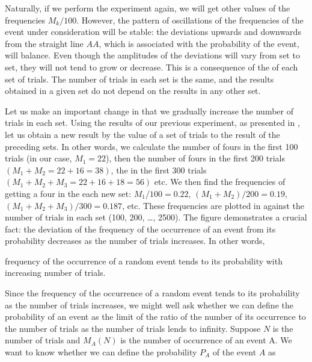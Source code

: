 Naturally, if we perform the experiment again,
we will get other values of the frequencies $M_{k}/100$. However, the
pattern of oscillations of the frequencies of the event under
consideration will be stable: the deviations upwards and downwards
from the straight line $AA$, which is associated with the probability
of the event, will balance. Even though the amplitudes of the
deviations will vary from set to set, they will not tend to grow or
decrease. This is a consequence of the  of each set
of trials. The number of trials in each set is the same, and the
results obtained in a given set do not depend on the results in any
other set.


 

Let us make an important change in that we gradually increase the
number of trials in each set. Using the results of our previous
experiment, as presented in , let us obtain a new
result by  the value of a set of trials to the result of
the preceding sets. In other words, we calculate the number of fours
in the first 100 trials (in our case, $M_{1} = 22$), then the number of
fours in the first 200 trials $(M_{1} + M_{2} = 22 + 16 = 38)$, the in
the first 300 trials  $(M_{1} + M_{2} +  M_{3}  = 22 + 16 + 18 = 56)$
etc. We then find the frequencies of getting a four in the each new
set: $M_{1}/100 = 0.22$, $(M_{1} + M_{2} )/200 = 0.19$, $(M_{1} +
M_{2} +  M_{3})/300  = 0.187$, etc.  These frequencies are plotted in
 against the number of trials in each set (100,
200, \ldots, 2500). The figure demonstrates a crucial fact: the
deviation of the frequency of the occurrence of an event from its
probability decreases as the number of trials increases. In other
words, 
\begin{mybox}{}
frequency of the occurrence of a random event tends to its probability with increasing number of trials.
\end{mybox}




Since the frequency of the occurrence of a random event tends to its
probability as the number of trials increases, we might well ask whether
we can define the probability of an event as the limit of the ratio of the
number of its occurrence to the number of trials as the number of trials
lends to infinity. Suppose $N$ is the number of trials and $M_{A} (N)$ is the
number of occurrence of an event A. We want to know whether we can
define the probability $P_{A}$ of the event $A$ as

